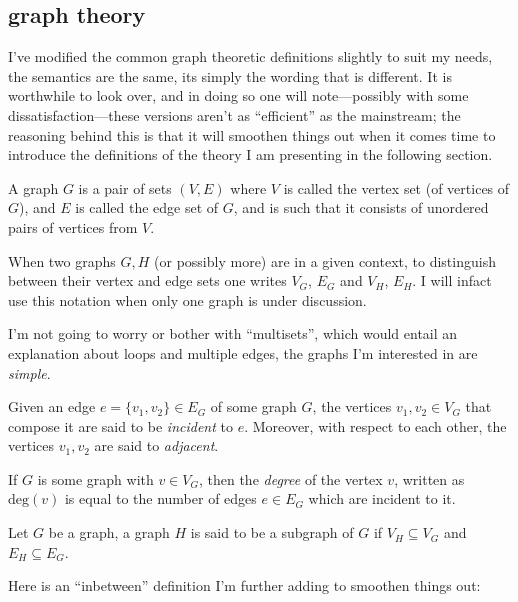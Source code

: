 \documentclass[twoside]{article}
\newenvironment{definition}[1][Definition]{\begin{trivlist}
\item[\hskip \labelsep {\bfseries #1}]}{\end{trivlist}}
\begin{document}
\subsection{graph theory}

I've modified the common graph theoretic definitions slightly to suit my needs, the semantics are the same, its simply
the wording that is different.  It is worthwhile to look over, and in doing so one will note---possibly with some
dissatisfaction---these versions aren't as ``efficient'' as the mainstream; the reasoning behind this is that it will
smoothen things out when it comes time to introduce the definitions of the theory I am presenting in the following section.

\begin{definition}[Graph]

A graph $ G $ is a pair of sets $ (V, E) $ where $ V $ is called the vertex set (of vertices of $ G $), and $ E $ is
called the edge set of $ G $, and is such that it consists of unordered pairs of vertices from $ V $.

\end{definition}
When two graphs $ G, H $ (or possibly more) are in a given context, to distinguish between their vertex and edge sets one
writes $ V_G $, $ E_G $ and $ V_H $, $ E_H $.  I will infact use this notation when only one graph is under discussion.

I'm not going to worry or bother with ``multisets'', which would entail an explanation about loops and multiple edges,
the graphs I'm interested in are \emph{simple}.

Given an edge $ e=\{v_1, v_2\}\in E_G $ of some graph $ G $, the vertices $ v_1, v_2\in V_G $ that compose it are said to
be \emph{incident} to $ e $.  Moreover, with respect to each other, the vertices $ v_1, v_2 $ are said to \emph{adjacent}.

If $ G $ is some graph with $ v\in V_G $, then the \emph{degree} of the vertex $ v $, written as $ \mbox{deg}(v) $ is
equal to the number of edges $ e\in E_G $ which are incident to it.

\begin{definition}[Subgraph]

Let $ G $ be a graph, a graph $ H $ is said to be a subgraph of $ G $ if $ V_H\subseteq V_G $ and $ E_H\subseteq E_G $.

\end{definition}
Here is an ``inbetween'' definition I'm further adding to smoothen things out:
\end{document}
